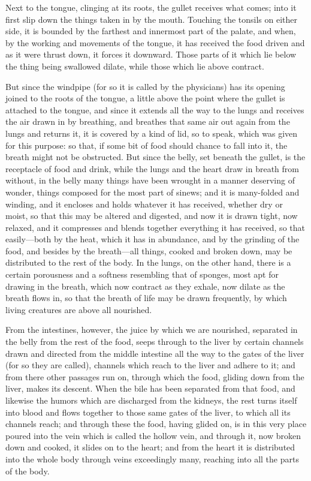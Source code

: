  Next to the tongue, clinging at its roots, the gullet receives what comes; into it first slip down the things taken in by the mouth. Touching the tonsils on either side, it is bounded by the farthest and innermost part of the palate, and when, by the working and movements of the tongue, it has received the food driven and as it were thrust down, it forces it downward. Those parts of it which lie below the thing being swallowed dilate, while those which lie above contract.

 But since the windpipe (for so it is called by the physicians) has its opening joined to the roots of the tongue, a little above the point where the gullet is attached to the tongue, and since it extends all the way to the lungs and receives the air drawn in by breathing, and breathes that same air out again from the lungs and returns it, it is covered by a kind of lid, so to speak, which was given for this purpose: so that, if some bit of food should chance to fall into it, the breath might not be obstructed. But since the belly, set beneath the gullet, is the receptacle of food and drink, while the lungs and the heart draw in breath from without, in the belly many things have been wrought in a manner deserving of wonder, things composed for the most part of sinews; and it is many-folded and winding, and it encloses and holds whatever it has received, whether dry or moist, so that this may be altered and digested, and now it is drawn tight, now relaxed, and it compresses and blends together everything it has received, so that easily—both by the heat, which it has in abundance, and by the grinding of the food, and besides by the breath—all things, cooked and broken down, may be distributed to the rest of the body. In the lungs, on the other hand, there is a certain porousness and a softness resembling that of sponges, most apt for drawing in the breath, which now contract as they exhale, now dilate as the breath flows in, so that the breath of life may be drawn frequently, by which living creatures are above all nourished.

 From the intestines, however, the juice by which we are nourished, separated in the belly from the rest of the food, seeps through to the liver by certain channels drawn and directed from the middle intestine all the way to the gates of the liver (for so they are called), channels which reach to the liver and adhere to it; and from there other passages run on, through which the food, gliding down from the liver, makes its descent. When the bile has been separated from that food, and likewise the humors which are discharged from the kidneys, the rest turns itself into blood and flows together to those same gates of the liver, to which all its channels reach; and through these the food, having glided on, is in this very place poured into the vein which is called the hollow vein, and through it, now broken down and cooked, it slides on to the heart; and from the heart it is distributed into the whole body through veins exceedingly many, reaching into all the parts of the body.

